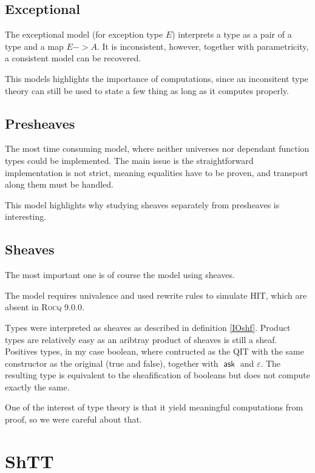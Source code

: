 \documentclass[11pt]{article}
\DeclareMathOperator{\ask}{\mathsf{ask}}
\newcommand{\0}{\mathbf{0}}
\newcommand{\1}{\mathbf{1}}
\begin{document}
\subsection{Exceptional}

The exceptional model (for exception type $E$) interprets a type as a pair of a type and a map $E -> A$. It is inconsistent, however, together with parametricity, a consistent model can be recovered.

This models highlights the importance of computations, since an inconsitent type theory can still be used to state a few thing as long as it computes properly.

\subsection{Presheaves}

The most time consuming model, where neither universes nor dependant function types could be implemented. The main issue is the straightforward implementation is not strict, meaning equalities have to be proven, and transport along them must be handled.

This model highlights why studying sheaves separately from presheaves is interesting.

\subsection{Sheaves}

The most important one is of course the model using sheaves.

The model requires univalence and used rewrite rules to simulate HIT, which are absent in \textsc{Rocq} 9.0.0.

Types were interpreted as sheaves as described in definition \ref{IOshf}. Product types are relatively easy as an aribtray product of sheaves is still a sheaf. Positives types, in my case boolean, where contructed as the QIT with the same constructor as the original (true and false), together with $\ask$ and $\varepsilon$. The resulting type is equivalent to the sheafification of booleans but does not compute exactly the same.

One of the interest of type theory is that it yield meaningful computations from proof, so we were careful about that.

\section{ShTT}\label{ShTT}
\end{document}
